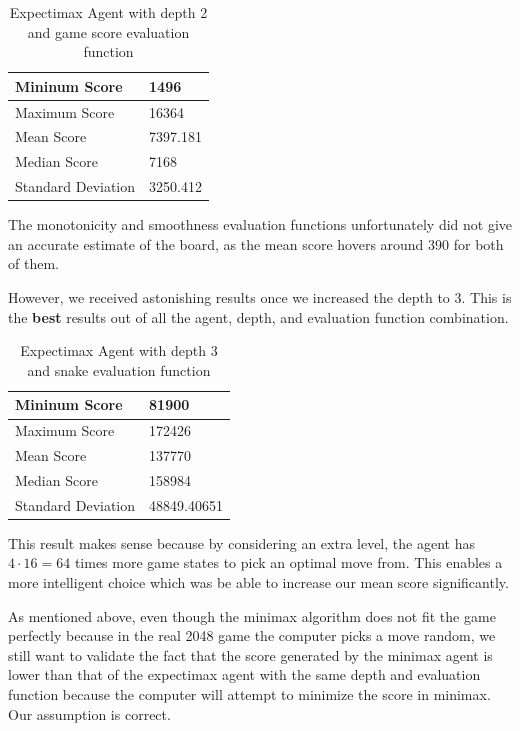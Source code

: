 \documentclass[9pt,twocolumn]{article}
\begin{document}
\begin{table}[!htbp]

\centering

\begin{tabular}{|l|l|}
\hline
Mininum Score      & 1496 \\ \hline
Maximum Score      & 16364 \\ \hline
Mean Score         & 7397.181 \\ \hline
Median Score       & 7168 \\ \hline
Standard Deviation & 3250.412 \\ \hline
\end{tabular}

\caption{Expectimax Agent with depth 2 and game score evaluation function}

\end{table}

The monotonicity and smoothness evaluation functions unfortunately did not give an accurate estimate of the board, as the mean score hovers around 390 for both of them.

However, we received astonishing results once we increased the depth to 3. This is the \textbf{best} results out of all the agent, depth, and evaluation function combination.

\begin{table}[!htbp]

\centering

\begin{tabular}{|l|l|}
\hline
Mininum Score      & 81900 \\ \hline
Maximum Score      & 172426 \\ \hline
Mean Score         & 137770 \\ \hline
Median Score       & 158984 \\ \hline
Standard Deviation & 48849.40651 \\ \hline
\end{tabular}

\caption{Expectimax Agent with depth 3 and snake evaluation function}

\end{table}

This result makes sense because by considering an extra level, the agent has $4 \cdot 16 = 64$ times more game states to pick an optimal move from. This enables a more intelligent choice which was be able to increase our mean score significantly.

As mentioned above, even though the minimax algorithm does not fit the game perfectly because in the real 2048 game the computer picks a move random, we still want to validate the fact that the score generated by the minimax agent is lower than that of the expectimax agent with the same depth and evaluation function because the computer will attempt to minimize the score in minimax. Our assumption is correct.
\end{document}
